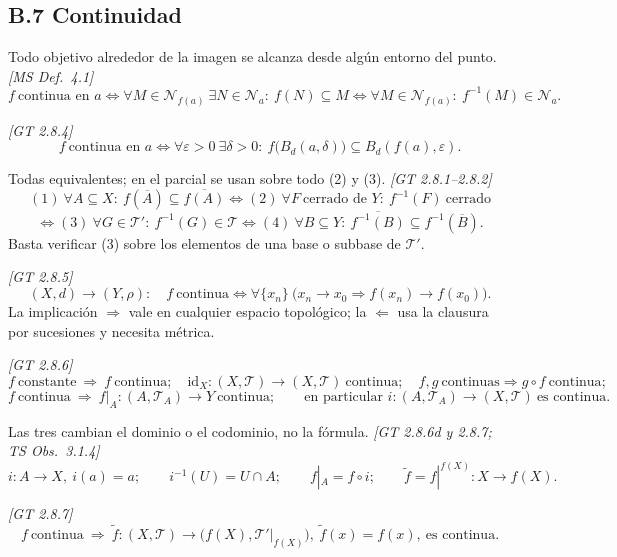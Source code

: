 \documentclass[11pt,a4paper]{article}
\theoremstyle{definition}
\theoremstyle{plain}
\newcommand{\fnt}[1]{{\normalfont\small\itshape\color{gray!150!black}[#1]}}
\newcommand{\cl}[1]{\overline{#1}}
\newcommand{\Bola}[2]{B_d(#1,#2)}
\newcommand{\tp}{\mathcal{T}}
\begin{document}
\subsection*{B.7 Continuidad}

\begin{itemize}[leftmargin=1.3em,itemsep=3pt]

 Todo objetivo alrededor de la imagen se alcanza desde algún entorno del punto. \fnt{MS Def.\ 4.1}
\[ f\ \text{continua en } a\iff \forall M\in\mathcal N_{f(a)}\ \exists N\in\mathcal N_a:\ f(N)\subseteq M
\iff \forall M\in\mathcal N_{f(a)}:\ f^{-1}(M)\in\mathcal N_a. \]

 \fnt{GT 2.8.4}
\[ f\ \text{continua en } a\iff \forall\varepsilon>0\ \exists\delta>0:\ f\big(\Bola{a}{\delta}\big)\subseteq \Bola{f(a)}{\varepsilon}. \]

 Todas equivalentes; en el parcial se usan sobre todo (2) y (3). \fnt{GT 2.8.1--2.8.2}
\[ (1)\ \forall A\subseteq X:\ f(\cl A)\subseteq\cl{f(A)}
\iff (2)\ \forall F\ \text{cerrado de } Y:\ f^{-1}(F)\ \text{cerrado} \]
\[ \iff (3)\ \forall G\in\tp':\ f^{-1}(G)\in\tp
\iff (4)\ \forall B\subseteq Y:\ \cl{f^{-1}(B)}\subseteq f^{-1}(\cl B). \]
Basta verificar (3) sobre los elementos de una base o subbase de $\tp'$.

 \fnt{GT 2.8.5}
\[ (X,d)\to(Y,\rho):\quad f\ \text{continua}\iff \forall\{x_n\}\ \big(x_n\to x_0\Rightarrow f(x_n)\to f(x_0)\big). \]
La implicación $\Rightarrow$ vale en cualquier espacio topológico; la $\Leftarrow$ usa la clausura por sucesiones y necesita métrica.

 \fnt{GT 2.8.6}
\[ f\ \text{constante}\ \Rightarrow\ f\ \text{continua};\quad
\mathrm{id}_X:(X,\tp)\to(X,\tp)\ \text{continua};\quad
f,g\ \text{continuas}\Rightarrow g\circ f\ \text{continua}; \]
\[ f\ \text{continua}\ \Rightarrow\ f|_A:(A,\tp_A)\to Y\ \text{continua};\qquad
\text{en particular } i:(A,\tp_A)\to(X,\tp)\ \text{es continua}. \]

 Las tres cambian el dominio o el codominio, no la fórmula. \fnt{GT 2.8.6d y 2.8.7; TS Obs.\ 3.1.4}
\[ i:A\to X,\ i(a)=a;\qquad i^{-1}(U)=U\cap A;\qquad f|_A=f\circ i;\qquad \widetilde f=f|^{f(X)}:X\to f(X). \]

 \fnt{GT 2.8.7}
\[ f\ \text{continua}\ \Rightarrow\ \widetilde f:(X,\tp)\to\big(f(X),\tp'|_{f(X)}\big),\ \widetilde f(x)=f(x),\ \text{es continua}. \]


\end{itemize}
\end{document}
